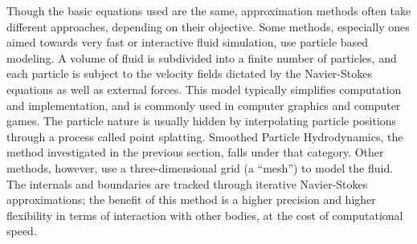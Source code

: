 \documentclass[a4paper]{article}
\begin{document}
Though the basic equations used are the same, approximation methods often take different approaches, depending on their objective. Some methods, especially ones aimed towards very fast or interactive fluid simulation, use particle based modeling. A volume of fluid is subdivided into a finite number of particles, and each particle is subject to the velocity fields dictated by the Navier-Stokes equations as well as external forces. This model typically simplifies computation and implementation, and is commonly used in computer graphics and computer games. The particle nature is usually hidden by interpolating particle positions through a process called point splatting. Smoothed Particle Hydrodynamics, the method investigated in the previous section, falls under that category.  Other methods, however, use a three-dimensional grid (a ``mesh'') to model the fluid. The internals and boundaries are tracked through iterative Navier-Stokes approximations; the benefit of this method is a higher precision and higher flexibility in terms of interaction with other bodies, at the cost of computational speed. 
\end{document}
